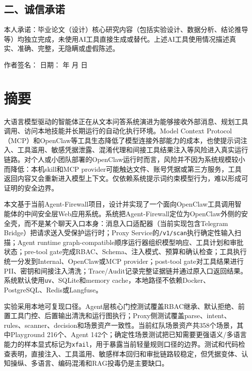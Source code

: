 \documentclass[UTF8,zihao=-4,scheme=chinese,fontset=none]{ctexart}
\newcommand{\code}[1]{{\ttfamily\small\nolinkurl{#1}}}
\begin{document}
\subsection*{二、诚信承诺}
本人承诺：毕业论文（设计）核心研究内容（包括实验设计、数据分析、结论推导等）均独立完成，未使用AI工具直接生成或替代。上述AI工具使用情况描述真实、准确、完整，无隐瞒或虚假陈述。

\vspace{1.5cm}
\noindent 作者签名：\hspace{5cm} 日期：\hspace{1cm} 年 \hspace{0.5cm} 月 \hspace{0.5cm} 日

\clearpage
{}
\setcounter{page}{1}
\section*{摘要}

大语言模型驱动的智能体正在从文本问答系统演进为能够接收外部消息、规划工具调用、访问本地技能并长期运行的自动化执行环境。Model Context Protocol（MCP）和OpenClaw等工具生态降低了模型连接外部能力的成本，也使提示词注入、工具滥用、敏感凭据泄露、混淆代理和间接工具结果注入等风险进入真实运行链路。对个人或小团队部署的OpenClaw运行时而言，风险并不因为系统规模较小而降低：本机skill和MCP provider可能触达文件、账号凭据或第三方服务，工具返回内容又会重新进入模型上下文。仅依赖系统提示词约束模型行为，难以形成可证明的安全边界。

本文基于当前Agent-Firewall项目，设计并实现了一个面向OpenClaw工具调用智能体的中间安全层Web应用系统。系统把Agent-Firewall定位为OpenClaw外侧的安全壳，而不是某个聊天入口本身：消息入口适配器（当前实现包含Telegram Bridge）把请求送入受保护运行时；Proxy Service的\code{/v1/scan}执行确定性输入扫描；Agent runtime graph-compatible顺序运行器组织模型响应、工具计划和审批状态；pre-tool gate完成RBAC、Schema、注入模式、预算和确认检查；工具执行统一分发到Internal、OpenClaw或MCP provider；post-tool gate对工具结果进行PII、密钥和间接注入清洗；Trace/Audit记录完整证据链并通过原入口返回结果。系统默认使用\code{uv}、SQLite和memory cache，本地路径不依赖Docker、PostgreSQL、Redis或Langfuse。

实验采用本地可复现口径。Agent层核心门控测试覆盖RBAC继承、默认拒绝、前置工具门控、后置输出清洗和运行图执行；Proxy侧测试覆盖parse、intent、rules、scanner、decision和场景资产一致性。当前红队场景资产共358个场景，其中Playground 216个、Agent 142个；确定性场景测试把已知需要更强语义/多语言能力的样本显式标记为\code{xfail}，用于暴露当前轻量规则口径的边界。测试和代码检查表明，直接注入、工具滥用、敏感样本回归和审批链路较稳定，但凭据变体、认知操纵、多语言、编码混淆和RAG投毒仍是主要缺口。
\end{document}
